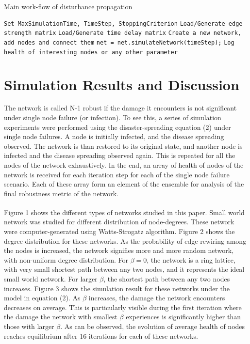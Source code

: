 \documentclass[11pt]{article}
\begin{document}
\begin{algorithm}
\caption{Main work-flow of disturbance propagation}\label{MAIN_PSEUDO_CODE}
\begin{algorithmic}[1]
			\State \texttt{Set MaxSimulationTime, TimeStep, StoppingCriterion}
			\State \texttt{Load/Generate edge strength matrix}
			\State \texttt{Load/Generate time delay matrix}
			\State \texttt{Create a new network, add nodes and connect them}
	\EndProcedure
			\State \texttt{net = net.simulateNetwork(timeStep);}
			\State \texttt{Log health of interesting nodes or any other parameter}
		\EndWhile
	\EndProcedure
\EndProcedure
\end{algorithmic}
\end{algorithm}

\newpage
\section{Simulation Results and Discussion}
The network is called N-1 robust if the damage it encounters is not significant under single node failure (or infection).  To see this, a series of simulation experiments were performed using the disaster-spreading equation (2) under single node failures. A node is initially infected, and the disease spreading observed. The network is than restored to its original state, and another node is infected and the disease spreading observed again. This is repeated for all the nodes of the network exhaustively. In the end, an array of health of nodes of the network is received for each iteration step for each of the single node failure scenario. Each of these array form an element of the ensemble for analysis of the final robustness metric of the network. \\
\\
Figure 1 shows the different types of networks studied in this paper. Small world network was studied for different distribution of node-degrees. These network were computer-generated using Watts-Strogatz algorithm. Figure 2 shows the degree distribution for these networks. As the probability of edge rewiring among the nodes is increased, the network signifies more and more random network, with non-uniform degree distribution. For $\beta=0$, the network is a ring lattice, with very small shortest path between any two nodes, and it represents the ideal small world network. For larger $\beta$, the shortest path between any two nodes increases. Figure 3 shows the simulation result for these networks under the model in equation (2). As $\beta$ increases, the damage the network encounters decreases on average. This is particularly visible during the first iteration where the damage the network with smallest $\beta$ experiences is significantly higher than those with larger $\beta$. As can be observed, the evolution of average health of nodes reaches equilibrium after 16 iterations for each of these networks. 
\end{document}
